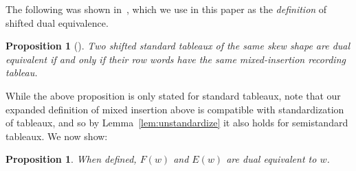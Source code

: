 \documentclass[10pt]{amsart}
\newtheorem{prop}[theorem]{Proposition}
\theoremstyle{definition}
\begin{document}
The following was shown in~\cite{Haiman}, which we use in this paper as the \emph{definition} of shifted dual equivalence.

\begin{prop}[{\cite[Lemma~2.11 and Theorem~2.12]{Haiman}}] \label{prop:Haiman1}
Two shifted standard tableaux of the same skew shape are dual equivalent if and only if their row words have the same mixed-insertion recording tableau.
\end{prop}

While the above proposition is only stated for standard tableaux, note that our expanded definition of mixed insertion above is compatible with standardization of tableaux, and so by Lemma~\ref{lem:unstandardize} it also holds for semistandard tableaux. We now show:

\begin{prop}
When defined, $F(w)$ and $E(w)$ are dual equivalent to $w$.
\end{prop}
\end{document}
